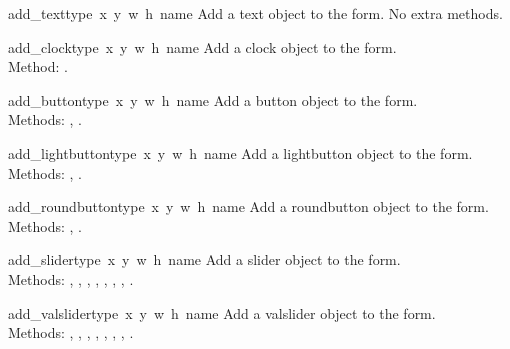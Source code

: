 \begin{flushleft}
\begin{funcdesc}{add_text}{type\, x\, y\, w\, h\, name}
Add a text object to the form.
No extra methods.
\end{funcdesc}


\begin{funcdesc}{add_clock}{type\, x\, y\, w\, h\, name}
Add a clock object to the form. \\
Method:
.
\end{funcdesc}


\begin{funcdesc}{add_button}{type\, x\, y\, w\, h\,  name}
Add a button object to the form. \\
Methods:
,
.
\end{funcdesc}

\begin{funcdesc}{add_lightbutton}{type\, x\, y\, w\, h\, name}
Add a lightbutton object to the form. \\
Methods:
,
.
\end{funcdesc}

\begin{funcdesc}{add_roundbutton}{type\, x\, y\, w\, h\, name}
Add a roundbutton object to the form. \\
Methods:
,
.
\end{funcdesc}


\begin{funcdesc}{add_slider}{type\, x\, y\, w\, h\, name}
Add a slider object to the form. \\
Methods:
,
,
,
,
,
,
,
.
\end{funcdesc}

\begin{funcdesc}{add_valslider}{type\, x\, y\, w\, h\, name}
Add a valslider object to the form. \\
Methods:
,
,
,
,
,
,
,
.
\end{funcdesc}


\end{flushleft}
